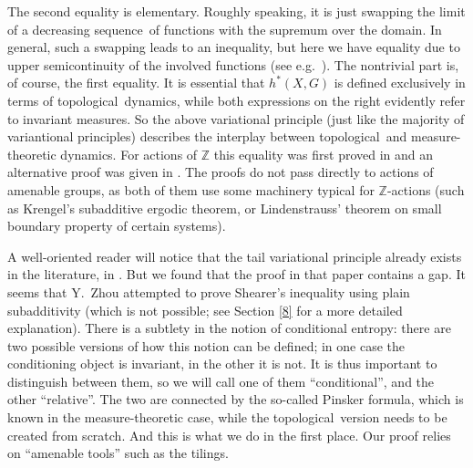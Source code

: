 \documentclass[12pt]{amsart}
\theoremstyle{definition}
\numberwithin{equation}{section}
\def \Z {\mathbb Z}
\def \sq {sequence}
\def \tl {topological}
\def \im {invariant measure}
\def \Z {\mathbb Z}
\def \sq {sequence}
\def \tl {topological}
\def \im {invariant measure}
\begin{document}
The second equality is elementary. Roughly speaking, it is just swapping the limit of a decreasing \sq\ of functions with the supremum over the domain. In general, such a swapping leads to an inequality, but here we have equality due to upper semicontinuity of the involved functions (see e.g.\ \cite[Proposition 2.4 ]{BD}). The nontrivial part is, of course, the first equality. It is essential that $h^*(X,G)$ is defined exclusively in terms of \tl\ dynamics, while both expressions on the right evidently refer to \im s. So the above variational principle (just like the majority of variantional principles) describes the interplay between \tl\ and measure-theoretic dynamics. For actions of $\Z$ this equality was first proved in \cite{D2005} and an alternative proof was given in \cite{Burguet09}. The proofs do not pass directly to actions of amenable groups, as both of them use some machinery typical for $\Z$-actions (such as Krengel's subadditive ergodic theorem, or Lindenstrauss' theorem on small boundary property of certain systems).

A well-oriented reader will notice that the tail variational principle already exists in the literature, in \cite{Zhou}. But we found that the proof in that paper contains a gap. It seems that Y.\ Zhou attempted to prove Shearer's inequality using plain subadditivity (which is not possible; see Section \ref{8} for a more detailed explanation). There is a subtlety in the notion of conditional entropy: there are two possible versions of how this notion can be defined; in one case the conditioning object is invariant, in the other it is not. It is thus important to distinguish between them, so we will call one of them ``conditional'', and the other ``relative''. The two are connected by the so-called Pinsker formula, which is known in the measure-theoretic case, while the \tl\ version needs to be created from scratch. And this is what we do in the first place. Our proof relies on ``amenable tools'' such as the tilings. 
\end{document}
